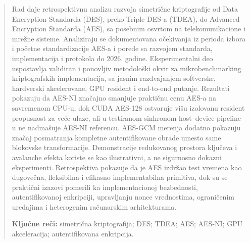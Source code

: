 \begin{abstract}
Rad daje retrospektivnu analizu razvoja simetrične kriptografije od
Data Encryption Standarda (DES), preko Triple DES-a (TDEA), do Advanced
Encryption Standarda (AES), sa posebnim osvrtom na telekomunikacione i
mrežne sisteme. Analiziraju se dokumentovana očekivanja iz perioda izbora
i početne standardizacije AES-a i porede sa razvojem standarda,
implementacija i protokola do 2026. godine. Eksperimentalni deo uspostavlja
validiran i ponovljiv metodološki okvir za mikrobenchmarking
kriptografskih implementacija, sa jasnim razdvajanjem softverske,
hardverski akcelerovane, GPU resident i end-to-end putanje. Rezultati
pokazuju da AES-NI značajno smanjuje praktičnu cenu AES-a na savremenom
CPU-u, dok CUDA AES-128 ostvaruje višu izolovanu resident propusnost za
veće ulaze, ali u testiranom sinhronom host--device pipeline-u ne
nadmašuje AES-NI referencu. AES-GCM merenja dodatno pokazuju značaj
posmatranja kompletne autentifikovane obrade umesto same blokovske
transformacije. Demonstracije redukovanog prostora ključeva i avalanche
efekta koriste se kao ilustrativni, a ne sigurnosno dokazni eksperimenti.
Retrospektiva pokazuje da je AES izdržao test vremena kao dugovečna,
fleksibilna i efikasno implementabilna primitiva, dok su se praktični
izazovi pomerili ka implementacionoj bezbednosti, autentifikovanoj
enkripciji, upravljanju nonce vrednostima, ograničenim uređajima i
heterogenim računarskim arhitekturama.

\noindent\textbf{Ključne reči:} simetrična kriptografija; DES; TDEA; AES;
AES-NI; GPU akceleracija; autentifikovana enkripcija.
\end{abstract}


